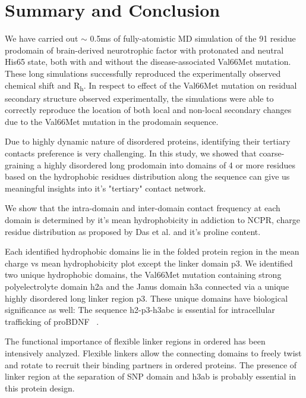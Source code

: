 \documentclass[journal=jacsat,manuscript=article]{achemso}
\begin{document}
\section*{Summary and Conclusion}

We have carried out $\sim$ 0.5ms of fully-atomistic MD simulation of the 91 residue prodomain of brain-derived neurotrophic factor with protonated and neutral His65 state, both with and without the disease-associated Val66Met mutation. These long simulations successfully reproduced the experimentally observed chemical shift and R\textsubscript{h}. In respect to effect of the Val66Met mutation on residual secondary structure observed experimentally, the simulations were able to correctly reproduce the location of both local and non-local secondary changes due to the Val66Met mutation in the prodomain sequence. 


Due to highly dynamic nature of disordered proteins, identifying their tertiary contacts preference is very challenging. In this study, we showed that coarse-graining a highly disordered long prodomain into domains of 4 or more residues based on the hydrophobic residues distribution along the sequence can give us meaningful insights into it's "tertiary" contact network. 

We show that the intra-domain and inter-domain contact frequency at each domain is determined by it's mean hydrophobicity in addiction to NCPR, charge residue distribution as proposed by Das et al. and it's proline content.

Each identified hydrophobic domains lie in the folded protein region in the mean charge vs mean hydrophobicity plot except the linker domain p3. We identified two unique hydrophobic domains, the Val66Met mutation containing strong polyelectrolyte domain h2a and the Janus domain h3a connected via a unique highly disordered long linker region p3. These unique domains have biological significance as well: The sequence h2-p3-h3abc is essential for intracellular trafficking of proBDNF ~\cite {Chen2005}. 

The functional importance of flexible linker regions in ordered has been intensively analyzed. Flexible linkers allow the connecting domains to freely twist and rotate to recruit their binding partners in ordered proteins. The presence of linker region at the separation of SNP domain and h3ab is probably essential in this protein design.
\end{document}
